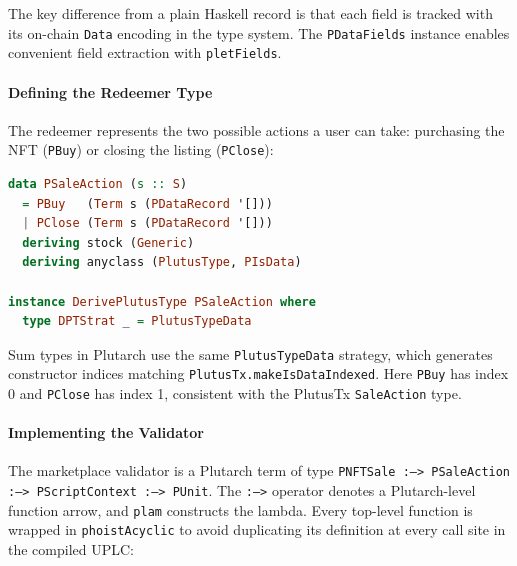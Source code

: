 The key difference from a plain Haskell record is that each field is tracked with its on-chain \texttt{Data} encoding in the type system. The \texttt{PDataFields} instance enables convenient field extraction with \texttt{pletFields}.

\paragraph{Defining the Redeemer Type}

The redeemer represents the two possible actions a user can take: purchasing the NFT (\texttt{PBuy}) or closing the listing (\texttt{PClose}):

\begin{lstlisting}[language=haskell, caption=Plutarch Redeemer Definition]
data PSaleAction (s :: S)
  = PBuy   (Term s (PDataRecord '[]))
  | PClose (Term s (PDataRecord '[]))
  deriving stock (Generic)
  deriving anyclass (PlutusType, PIsData)

instance DerivePlutusType PSaleAction where
  type DPTStrat _ = PlutusTypeData
\end{lstlisting}

Sum types in Plutarch use the same \texttt{PlutusTypeData} strategy, which generates constructor indices matching \texttt{PlutusTx.makeIsDataIndexed}. Here \texttt{PBuy} has index 0 and \texttt{PClose} has index 1, consistent with the PlutusTx \texttt{SaleAction} type.

\paragraph{Implementing the Validator}

The marketplace validator is a Plutarch term of type \texttt{PNFTSale :--> PSaleAction :--> PScriptContext :--> PUnit}. The \texttt{:-->} operator denotes a Plutarch-level function arrow, and \texttt{plam} constructs the lambda. Every top-level function is wrapped in \texttt{phoistAcyclic} to avoid duplicating its definition at every call site in the compiled UPLC:

